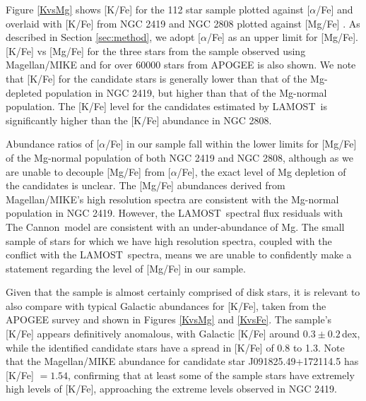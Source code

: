 \documentclass[a4paper,fleqn,usenatbib]{mnras}
\newcommand{\project}[1]{#1}
\newcommand{\lamost}{\project{LAMOST}}
\newcommand{\tc}{\project{The Cannon}}
\begin{document}
Figure \ref{KvsMg} shows [K/Fe]  for the 112 star sample plotted against $[\alpha$/Fe] and overlaid with [K/Fe] from NGC 2419 and NGC 2808 plotted against [Mg/Fe] \citep{cohenkirby2012, mucciarelli2012, mucciarelli2015}. As described in Section \ref{sec:method}, we adopt [$\alpha$/Fe] as an upper limit for [Mg/Fe]. [K/Fe] vs [Mg/Fe] for the three stars from the sample observed using Magellan/MIKE and for over 60000 stars from APOGEE \citep{alam2015} is also shown. 
We note that [K/Fe] for the candidate stars is generally lower than that of the Mg-depleted population in NGC 2419, but higher than that of the Mg-normal population. The [K/Fe] level for the candidates estimated by \lamost\ is significantly higher than the [K/Fe] abundance in NGC 2808.

Abundance ratios of [$\alpha$/Fe] in our sample fall within the lower limits for [Mg/Fe] of the Mg-normal population of both NGC 2419 and NGC 2808, although as we are unable to decouple [Mg/Fe] from $[\alpha$/Fe], the exact level of Mg depletion of the candidates is unclear. The [Mg/Fe] abundances derived from Magellan/MIKE's high resolution spectra are consistent with the Mg-normal population in NGC 2419. However, the \lamost\ spectral flux residuals with \tc\ model are consistent with an under-abundance of Mg. The small sample of stars for which we have high resolution spectra, coupled with the conflict with the \lamost\ spectra, means we are unable to confidently make a statement regarding the level of [Mg/Fe] in our sample.

Given that the sample is almost certainly comprised of disk stars, it is relevant to also compare with typical Galactic abundances for [K/Fe], taken from the APOGEE survey \citep{alam2015} and shown in Figures \ref{KvsMg} and \ref{KvsFe}. The sample's [K/Fe] appears definitively anomalous, with Galactic [K/Fe] around $0.3 \pm 0.2$\,dex, while the identified candidate stars have a spread in [K/Fe] of 0.8 to 1.3. Note that the Magellan/MIKE abundance for candidate star J091825.49+172114.5 has [K/Fe] $=1.54$, confirming that at least some of the sample stars have extremely high levels of [K/Fe], approaching the extreme levels observed in NGC 2419.
\end{document}
